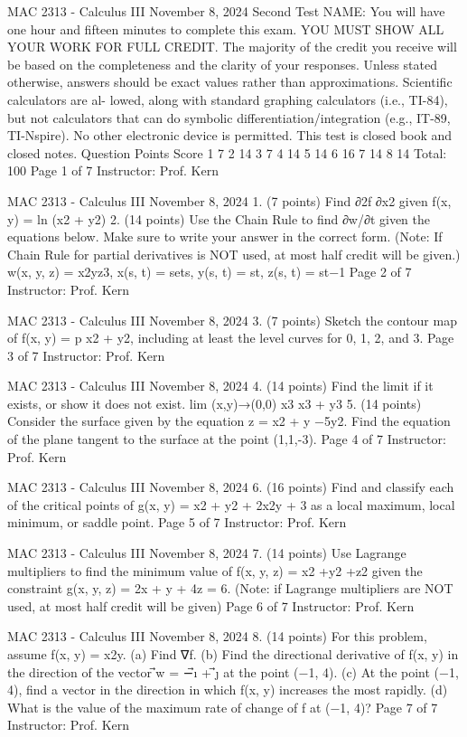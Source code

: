 MAC 2313 - Calculus III
November 8, 2024
Second Test
NAME:
You will have one hour and fifteen minutes to complete this exam. YOU MUST SHOW
ALL YOUR WORK FOR FULL CREDIT. The majority of the credit you receive will
be based on the completeness and the clarity of your responses. Unless stated otherwise,
answers should be exact values rather than approximations. Scientific calculators are al-
lowed, along with standard graphing calculators (i.e., TI-84), but not calculators that can
do symbolic differentiation/integration (e.g., IT-89, TI-Nspire). No other electronic device
is permitted. This test is closed book and closed notes.
Question
Points
Score
1
7
2
14
3
7
4
14
5
14
6
16
7
14
8
14
Total:
100
Page 1 of 7
Instructor: Prof. Kern

MAC 2313 - Calculus III
November 8, 2024
1.
(7 points)
Find ∂2f
∂x2 given f(x, y) = ln (x2 + y2)
2.
(14 points)
Use the Chain Rule to find ∂w/∂t given the equations below. Make sure to write your
answer in the correct form. (Note: If Chain Rule for partial derivatives is NOT used, at
most half credit will be given.)
w(x, y, z) = x2yz3, x(s, t) = sets, y(s, t) = st, z(s, t) = st−1
Page 2 of 7
Instructor: Prof. Kern

MAC 2313 - Calculus III
November 8, 2024
3.
(7 points)
Sketch the contour map of f(x, y) =
p
x2 + y2, including at least the level curves for 0,
1, 2, and 3.
Page 3 of 7
Instructor: Prof. Kern

MAC 2313 - Calculus III
November 8, 2024
4.
(14 points)
Find the limit if it exists, or show it does not exist.
lim
(x,y)→(0,0)
x3
x3 + y3
5.
(14 points)
Consider the surface given by the equation z = x2 + y −5y2. Find the equation of the
plane tangent to the surface at the point (1,1,-3).
Page 4 of 7
Instructor: Prof. Kern

MAC 2313 - Calculus III
November 8, 2024
6.
(16 points)
Find and classify each of the critical points of g(x, y) = x2 + y2 + 2x2y + 3 as a local
maximum, local minimum, or saddle point.
Page 5 of 7
Instructor: Prof. Kern

MAC 2313 - Calculus III
November 8, 2024
7.
(14 points)
Use Lagrange multipliers to find the minimum value of f(x, y, z) = x2 +y2 +z2 given the
constraint g(x, y, z) = 2x + y + 4z = 6. (Note: if Lagrange multipliers are NOT used, at
most half credit will be given)
Page 6 of 7
Instructor: Prof. Kern

MAC 2313 - Calculus III
November 8, 2024
8.
(14 points)
For this problem, assume f(x, y) = x2y.
(a) Find ∇f.
(b) Find the directional derivative of f(x, y) in the direction of the vector ⃗w = −⃗ı + ⃗ȷ
at the point (−1, 4).
(c) At the point (−1, 4), find a vector in the direction in which f(x, y) increases the
most rapidly.
(d) What is the value of the maximum rate of change of f at (−1, 4)?
Page 7 of 7
Instructor: Prof. Kern

